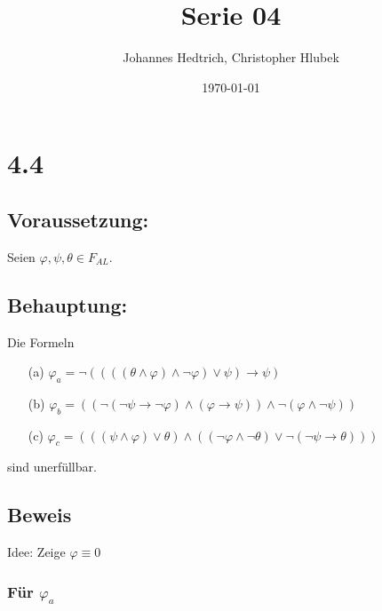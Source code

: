 \documentclass[12pt,a4paper]{scrartcl}
\title{Serie 04}
\author{Johannes Hedtrich, Christopher Hlubek}
\date{\today}
\begin{document}
\section*{4.4}
\subsection*{Voraussetzung:}

Seien $\varphi, \psi, \theta \in F_{AL}$.

\subsection*{Behauptung:}
Die Formeln
\begin{enumerate}
  \item[(a)] $\varphi_a = \neg((((\theta \wedge \varphi) \wedge \neg \varphi) \vee \psi) \rightarrow \psi)$
  \item[(b)] $\varphi_b = ((\neg (\neg \psi \rightarrow \neg \varphi) \wedge (\varphi \rightarrow \psi)) \wedge \neg(\varphi \wedge \neg \psi))$
  \item[(c)] $\varphi_c = (((\psi \wedge \varphi) \vee \theta) \wedge ((\neg \varphi \wedge \neg \theta) \vee \neg(\neg \psi \rightarrow \theta)))$
\end{enumerate}
sind unerfüllbar.

\subsection*{Beweis}

Idee: Zeige $\varphi \equiv 0$
\subsubsection*{Für $\varphi_a$}
\end{document}

